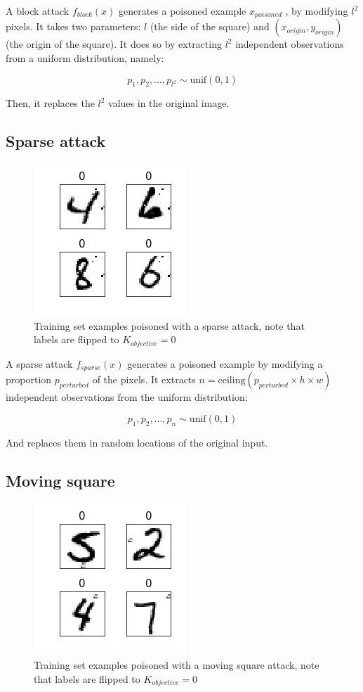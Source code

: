 \documentclass[letterpaper, 10 pt, conference]{ieeeconf}  %
\begin{document}
A block attack $f_{block}(x)$ generates a poisoned example $x_{poisoned}$ , by modifying $l^2$ pixels. It takes two parameters: $l$ (the side of the square) and $(x_{origin}, y_{origin})$ (the origin of the square). It does so by extracting $l^2$ independent observations from a uniform distribution, namely:

$$p_1, p_2,...,p_{l^2}\sim \text{unif}(0, 1)$$

Then, it replaces the $l^2$ values in the original image.


\subsection{Sparse attack}

\begin{figure}[h]
\caption{Training set examples poisoned with a sparse attack, note that labels are flipped to $K_{objective}=0$}
\centering
\includegraphics{sparse.png}
\end{figure}

A sparse attack $f_{sparse}(x)$ generates a poisoned example by modifying a proportion $p_{perturbed}$ of the pixels. It extracts $n = \text{ceiling}(p_{perturbed} \times h \times w)$ independent observations from the uniform distribution:

$$p_1, p_2,...,p_{n}\sim \text{unif}(0, 1)$$

And replaces them in random locations of the original input.

\subsection{Moving square}

\begin{figure}[h]
\caption{Training set examples poisoned with a moving square attack, note that labels are flipped to $K_{objective}=0$}
\centering
\includegraphics{moving-square.png}
\end{figure}
\end{document}
